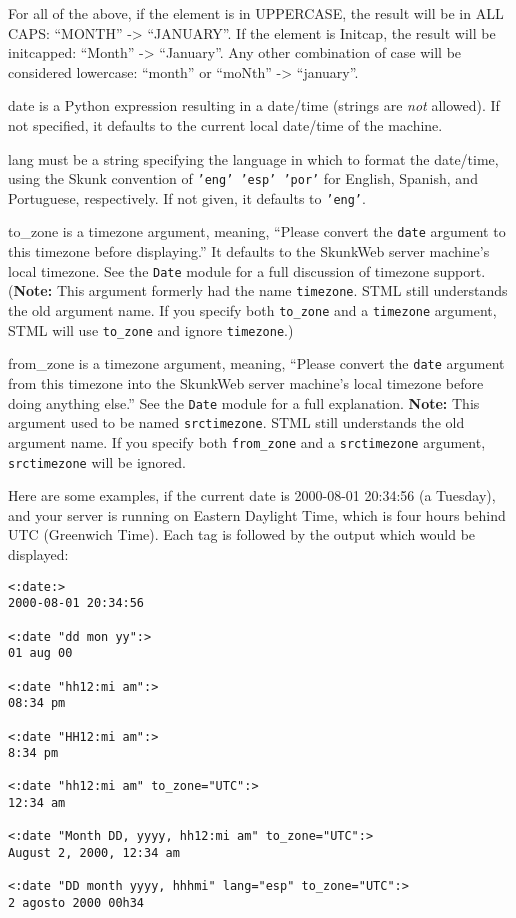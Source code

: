 \documentclass{manual}
\begin{document}
    For all of the above, if the element is in UPPERCASE, 
    the result will be in ALL CAPS: ``MONTH'' -> ``JANUARY''. 
    If the element is Initcap, the result will be initcapped: 
    ``Month'' -> ``January''. Any other combination of case will 
    be considered lowercase: ``month'' or ``moNth'' -> ``january''.
    
\begin{argdesc}
\item[date] is a Python expression resulting in a
date/time (strings are \emph{not} allowed). 
If not specified, it defaults to the current local date/time of the machine.

\item[lang] must be a string specifying the language in which
to format the date/time, using the Skunk convention of \texttt{'eng'
'esp' 'por'} for English, Spanish, and Portuguese, respectively.
If not given, it defaults to \texttt{'eng'}.

\item[to_zone] is a timezone argument, meaning, ``Please convert
the \texttt{date} argument to this timezone before displaying.'' It defaults
to the SkunkWeb server machine's local timezone. See the \texttt{Date} module
for a full discussion of timezone support. (\textbf{Note:} This argument
formerly had the name \texttt{timezone}. STML still understands the old argument
name. If you specify both \texttt{to_zone} and a \texttt{timezone} argument,
STML will use \texttt{to_zone} and ignore \texttt{timezone}.)

\item[from_zone] is a timezone argument, meaning, ``Please convert
the \texttt{date} argument from this timezone into the SkunkWeb server
machine's local timezone before doing anything else.'' See the
\texttt{Date} module for a full explanation. \textbf{Note:} This argument
used to be named \texttt{srctimezone}. STML still understands the old
argument name. If you specify both \texttt{from_zone} and a
\texttt{srctimezone} argument, \texttt{srctimezone} will be ignored.
\end{argdesc}

Here are some examples, if the current date is 2000-08-01 20:34:56
(a Tuesday), and your server is running on Eastern Daylight Time, which
is four hours behind UTC (Greenwich Time). Each tag is followed by
the output which would be displayed:

\begin{verbatim}
<:date:> 
2000-08-01 20:34:56

<:date "dd mon yy":>
01 aug 00

<:date "hh12:mi am":>  
08:34 pm

<:date "HH12:mi am":>  
8:34 pm

<:date "hh12:mi am" to_zone="UTC":>  
12:34 am

<:date "Month DD, yyyy, hh12:mi am" to_zone="UTC":>  
August 2, 2000, 12:34 am

<:date "DD month yyyy, hhhmi" lang="esp" to_zone="UTC":>  
2 agosto 2000 00h34
\end{verbatim}
\end{document}
